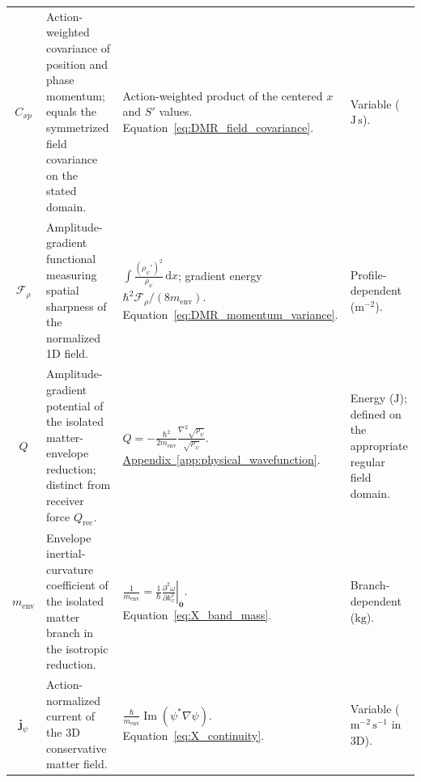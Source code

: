 \begin{longtable}{@{} c p{5.5cm} p{4cm} p{3.5cm} @{}}
$C_{xp}$ & {\raggedright Action-weighted covariance of position and phase momentum; equals the symmetrized field covariance on the stated domain.\par} & {\raggedright Action-weighted product of the centered $x$ and $S'$ values. \newline Equation~\eqref{eq:DMR_field_covariance}.\par} & {\raggedright Variable ($\mathrm{J\,s}$).\par} \\

$\mathcal F_\rho$ & {\raggedright Amplitude-gradient functional measuring spatial sharpness of the normalized 1D field.\par} & {\raggedright $\displaystyle\int \frac{(\rho_\psi')^2}{\rho_\psi}\,\mathrm dx$; gradient energy $\hbar^2\mathcal F_\rho/(8m_{\mathrm{env}})$. \newline Equation~\eqref{eq:DMR_momentum_variance}.\par} & {\raggedright Profile-dependent ($\mathrm{m^{-2}}$).\par} \\

$Q$ & {\raggedright Amplitude-gradient potential of the isolated matter-envelope reduction; distinct from receiver force $Q_{\mathrm{rec}}$.\par} & {\raggedright $Q=-\frac{\hbar^2}{2m_{\mathrm{env}}}\frac{\nabla^2\sqrt{\rho_\psi}}{\sqrt{\rho_\psi}}$. \newline \hyperref[app:physical_wavefunction]{Appendix~\ref*{app:physical_wavefunction}}.\par} & {\raggedright Energy ($\mathrm J$); defined on the appropriate regular field domain.\par} \\


$m_{\mathrm{env}}$ & {\raggedright Envelope inertial-curvature coefficient of the isolated matter branch in the isotropic reduction.\par} & {\raggedright $\displaystyle\frac1{m_{\mathrm{env}}}=\frac1\hbar\left.\frac{\partial^2\omega}{\partial k_x^2}\right|_{\mathbf0}$. \newline Equation~\eqref{eq:X_band_mass}.\par} & {\raggedright Branch-dependent ($\mathrm{kg}$).\par} \\

$\mathbf j_\psi$ & {\raggedright Action-normalized current of the 3D conservative matter field.\par} & {\raggedright $\displaystyle\frac{\hbar}{m_{\mathrm{env}}}\operatorname{Im}(\psi^*\nabla\psi)$. \newline Equation~\eqref{eq:X_continuity}.\par} & {\raggedright Variable ($\mathrm{m^{-2}\,s^{-1}}$ in 3D).\par} \\


\end{longtable}
